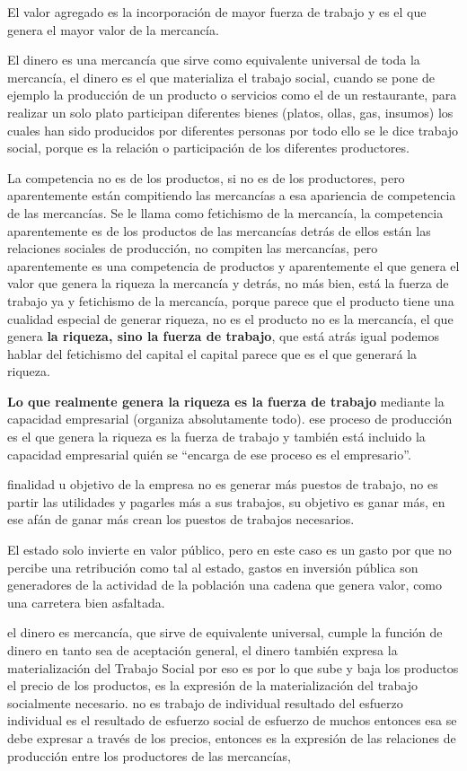 \documentclass[
  a4paper,
]{article}
\begin{document}
El valor agregado es la incorporación de mayor fuerza de trabajo y es el
que genera el mayor valor de la mercancía.

El dinero es una mercancía que sirve como equivalente universal de toda
la mercancía, el dinero es el que materializa el trabajo social, cuando
se pone de ejemplo la producción de un producto o servicios como el de
un restaurante, para realizar un solo plato participan diferentes bienes
(platos, ollas, gas, insumos) los cuales han sido producidos por
diferentes personas por todo ello se le dice trabajo social, porque es
la relación o participación de los diferentes productores.

La competencia no es de los productos, si no es de los productores, pero
aparentemente están compitiendo las mercancías a esa apariencia de
competencia de las mercancías. Se le llama como fetichismo de la
mercancía, la competencia aparentemente es de los productos de las
mercancías detrás de ellos están las relaciones sociales de producción,
no compiten las mercancías, pero aparentemente es una competencia de
productos y aparentemente el que genera el valor que genera la riqueza
la mercancía y detrás, no más bien, está la fuerza de trabajo ya y
fetichismo de la mercancía, porque parece que el producto tiene una
cualidad especial de generar riqueza, no es el producto no es la
mercancía, el que genera \textbf{la riqueza, sino la fuerza de trabajo},
que está atrás igual podemos hablar del fetichismo del capital el
capital parece que es el que generará la riqueza.

\textbf{Lo que realmente genera la riqueza es la fuerza de trabajo}
mediante la capacidad empresarial (organiza absolutamente todo). ese
proceso de producción es el que genera la riqueza es la fuerza de
trabajo y también está incluido la capacidad empresarial quién se
``encarga de ese proceso es el empresario''.

finalidad u objetivo de la empresa no es generar más puestos de trabajo,
no es partir las utilidades y pagarles más a sus trabajos, su objetivo
es ganar más, en ese afán de ganar más crean los puestos de trabajos
necesarios.

El estado solo invierte en valor público, pero en este caso es un gasto
por que no percibe una retribución como tal al estado, gastos en
inversión pública son generadores de la actividad de la población una
cadena que genera valor, como una carretera bien asfaltada.

el dinero es mercancía, que sirve de equivalente universal, cumple la
función de dinero en tanto sea de aceptación general, el dinero también
expresa la materialización del Trabajo Social por eso es por lo que sube
y baja los productos el precio de los productos, es la expresión de la
materialización del trabajo socialmente necesario. no es trabajo de
individual resultado del esfuerzo individual es el resultado de esfuerzo
social de esfuerzo de muchos entonces esa se debe expresar a través de
los precios, entonces es la expresión de las relaciones de producción
entre los productores de las mercancías,
\end{document}
